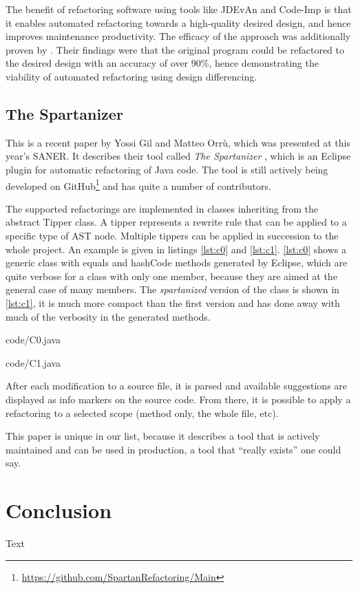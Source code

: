 \documentclass[conference,compsoc,a4paper]{IEEEtran}
\newcommand{\code}[1]{{\small\ttfamily #1}}
\newcommand{\JDEvAn}{\mbox{JDEvAn}\xspace}
\begin{document}
The benefit of refactoring software using tools like \JDEvAn and Code-Imp is that it enables automated refactoring 
towards a high-quality desired design, and hence improves maintenance productivity. The efficacy of the approach was 
additionally proven by \cite{design-diff}. Their findings were that the original program could be refactored to the 
desired design with an accuracy of over 90\%, hence demonstrating the viability of automated refactoring using design 
differencing.

\subsection{The Spartanizer}

This is a recent paper by Yossi Gil and Matteo Orrù, which was presented at this year's SANER. It describes their tool 
called \emph{The Spartanizer} \cite{sparta}, which is an Eclipse plugin for automatic refactoring of Java code. The 
tool is still actively being developed on GitHub\footnote{\url{https://github.com/SpartanRefactoring/Main}} and has 
quite a number of contributors.

The supported refactorings are implemented in classes inheriting from the abstract \code{Tipper} class. A tipper 
represents a rewrite rule that can be applied to a specific type of AST node. Multiple tippers can be applied in 
succession to the whole project. An example is given in listings \ref{lst:c0} and \ref{lst:c1}. \autoref{lst:c0} shows 
a generic class with \code{equals} and \code{hashCode} methods generated by Eclipse, which are quite verbose for a 
class with only one member, because they are aimed at the general case of many members. The \emph{spartanized} version 
of the class is shown in \autoref{lst:c1}, it is much more compact than the first version and has done away with much 
of the verbosity in the generated methods.


  {code/C0.java}


  {code/C1.java}

After each modification to a source file, it is parsed and available suggestions are displayed as info markers on the 
source code. From there, it is possible to apply a refactoring to a selected scope (method only, the whole file, etc).

This paper is unique in our list, because it describes a tool that is actively maintained and can be used in 
production, a tool that \enquote{really exists} one could say.


\section{Conclusion}

Text






\end{document}
